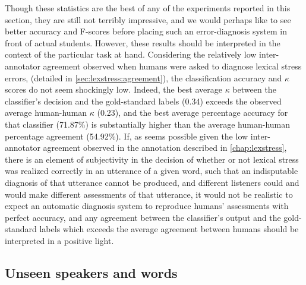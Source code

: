 Though these statistics are the best of any of the experiments reported in this section, they are still not terribly impressive, and we would perhaps like to see better accuracy and F-scores before placing such an error-diagnosis system in front of actual students. However, these results should be interpreted in the context of the particular task at hand.
Considering the relatively low inter-annotator agreement observed when humans were asked to 
diagnose lexical stress errors,
(detailed in \cref{sec:lexstress:agreement}), the classification accuracy and $\kappa$ scores do not seem shockingly low. Indeed, the best average $\kappa$ between the classifier's decision and the gold-standard labels (0.34) exceeds the observed average human-human $\kappa$ (0.23), and the best average percentage accuracy for that classifier (71.87\%) is substantially higher than the average human-human percentage agreement (54.92\%).
		 If, as seems possible given the low inter-annotator agreement observed in the annotation described in \cref{chap:lexstress}, there is an element of subjectivity in the decision of whether or not lexical stress was realized correctly in an utterance of a given word, such that an indisputable diagnosis of that utterance cannot be produced, and different listeners could and would make different assessments of that utterance, it would not be realistic to expect an automatic diagnosis system to reproduce humans' assessments with perfect accuracy, and any agreement between the classifier's output and the gold-standard labels which exceeds the average agreement between humans should be interpreted in a positive light. 



	\subsection{Unseen speakers and words}
	\label{sec:classification:unseen}
	
	
